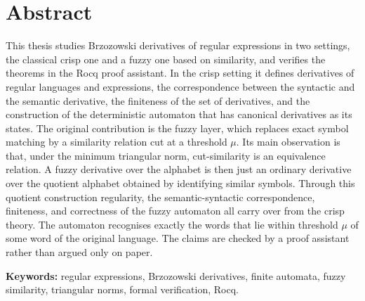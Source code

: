 \section*{Abstract}

This thesis studies Brzozowski derivatives of regular expressions in two settings,
the classical crisp one and a fuzzy one based on similarity, and verifies the theorems
in the Rocq proof assistant. In the crisp setting it defines derivatives of regular languages and expressions, the
correspondence between the syntactic and the semantic derivative, the finiteness of
the set of derivatives, and the construction of the deterministic automaton that has
canonical derivatives as its states. The original contribution is the fuzzy layer,
which replaces exact symbol matching by a similarity relation cut at a threshold
$\mu$. Its main observation is that, under the minimum triangular norm,
cut-similarity is an equivalence relation. A fuzzy derivative over the alphabet is
then just an ordinary derivative over the quotient alphabet obtained by identifying
similar symbols. Through this quotient construction regularity, the
semantic-syntactic correspondence, finiteness, and correctness of the fuzzy
automaton all carry over from the crisp theory. The automaton recognises exactly
the words that lie within threshold $\mu$ of some word of the original language.
The claims are checked by a proof assistant rather than argued only on paper.

\bigskip
\noindent\textbf{Keywords:} regular expressions, Brzozowski derivatives, finite
automata, fuzzy similarity, triangular norms, formal verification, Rocq.

\clearpage
